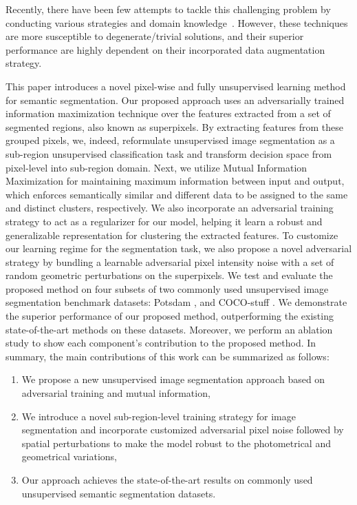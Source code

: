 \documentclass[letterpaper, 10 pt, journal, twoside]{IEEEtran}
\begin{document}
Recently, there have been few attempts to tackle this challenging problem by conducting various strategies and domain knowledge~\cite{WNet, IIC, SegSort, ARL}. However, these techniques are more susceptible to degenerate/trivial solutions, and their superior performance are highly dependent on their incorporated data augmentation strategy. \par
This paper introduces a novel pixel-wise and fully unsupervised learning method for semantic segmentation. Our proposed approach uses an adversarially trained information maximization technique over the features extracted from a set of segmented regions, also known as superpixels.
By extracting features from these grouped pixels, we, indeed, reformulate unsupervised image segmentation as a sub-region unsupervised classification task and transform decision space from pixel-level into sub-region domain. Next, we utilize Mutual Information Maximization for maintaining maximum information between input and output, which enforces semantically similar and different data to be assigned to the same and distinct clusters, respectively. We also incorporate an adversarial training strategy to act as a regularizer for our model, helping it learn a robust and generalizable representation for clustering the extracted features. To customize our learning regime for the segmentation task, we also propose a novel adversarial strategy by bundling a learnable adversarial pixel intensity noise with a set of random geometric perturbations on the superpixels.
We test and evaluate the proposed method on four subsets of two commonly used unsupervised image segmentation benchmark datasets: Potsdam \cite{Potsdam}, and COCO-stuff \cite{Cocostuff}. We demonstrate the superior performance of our proposed method, outperforming the existing state-of-the-art methods on these datasets. Moreover, we perform an ablation study to show each component's contribution to the proposed method. In summary, the main contributions of this work can be summarized as follows:

\begin{enumerate}
\itemsep0em
\item We propose a new unsupervised image segmentation approach based on adversarial training and mutual information,
\item We introduce a novel sub-region-level training strategy for image segmentation and incorporate customized adversarial pixel noise followed by spatial perturbations to make the model robust to the  photometrical and geometrical variations,
\item Our approach achieves the state-of-the-art results on commonly used unsupervised semantic segmentation datasets.
\end{enumerate}\par
\end{document}
